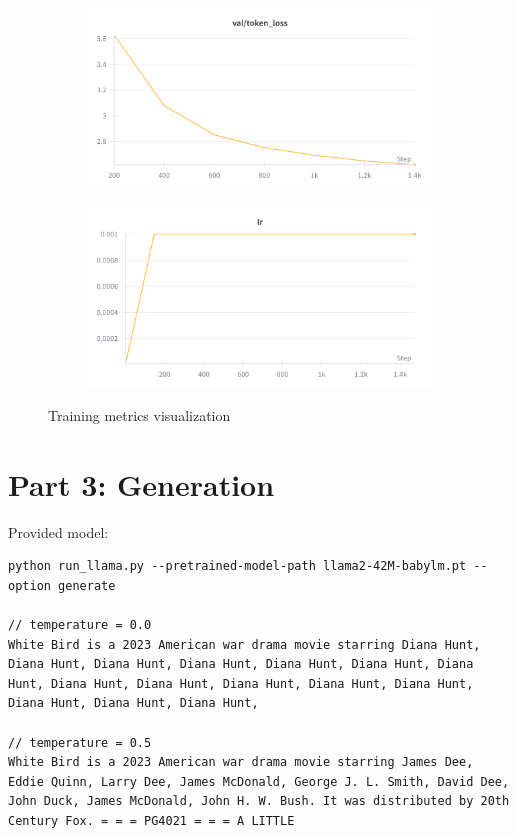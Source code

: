 \documentclass[11pt,a4paper]{article}
\begin{document}
\begin{figure}[h!]
    \begin{subfigure}[b]{0.48\textwidth}
        \centering
        \includegraphics[width=\textwidth]{val_loss.png}
        \label{fig:val_loss}
    \end{subfigure}
    \hfill
    \begin{subfigure}[b]{0.48\textwidth}
        \centering
        \includegraphics[width=\textwidth]{lr.png}
        \label{fig:lr}
    \end{subfigure}
    
    \caption{Training metrics visualization}
    \label{fig:training_metrics}
\end{figure}

\section{Part 3: Generation}


Provided model:

\begin{lstlisting}
python run_llama.py --pretrained-model-path llama2-42M-babylm.pt --option generate

// temperature = 0.0
White Bird is a 2023 American war drama movie starring Diana Hunt, Diana Hunt, Diana Hunt, Diana Hunt, Diana Hunt, Diana Hunt, Diana Hunt, Diana Hunt, Diana Hunt, Diana Hunt, Diana Hunt, Diana Hunt, Diana Hunt, Diana Hunt, Diana Hunt,

// temperature = 0.5
White Bird is a 2023 American war drama movie starring James Dee, Eddie Quinn, Larry Dee, James McDonald, George J. L. Smith, David Dee, John Duck, James McDonald, John H. W. Bush. It was distributed by 20th Century Fox. = = = PG4021 = = = A LITTLE
\end{lstlisting}
\end{document}
